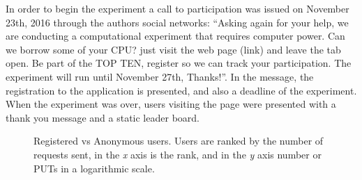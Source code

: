 \documentclass{llncs}
\begin{document}
In order to begin the experiment a call to participation was issued on November 23th, 
2016 through the authors social networks:
``Asking again for your help, we are conducting a computational experiment
that requires computer power. Can we borrow some of your CPU? just visit the web page (link)
and leave the tab open. Be part of the TOP TEN, register so we can track your participation.
The experiment will run until November 27th, Thanks!''. In the message, the registration
to the application is presented, and also a deadline of the experiment. When the
experiment was over, users visiting the page were presented with a thank you message 
and a static leader board. 
%
\begin{figure}[htbp]
    \centering

    \caption{
        Registered vs Anonymous users.  Users are ranked by
        the number of requests sent, in the \emph{x} axis is the rank, and in the \emph{y} axis 
        number or PUTs in a logarithmic scale.    }
    \label{fig:puts}
\end{figure}
%
\end{document}
